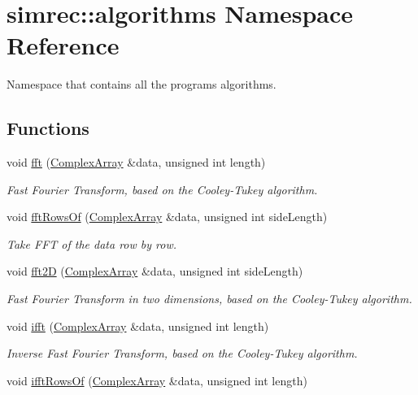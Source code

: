 \hypertarget{namespacesimrec_1_1algorithms}{\section{simrec\-:\-:algorithms \-Namespace \-Reference}
\label{namespacesimrec_1_1algorithms}
}


\-Namespace that contains all the programs algorithms.  


\subsection*{\-Functions}
\begin{DoxyCompactItemize}
\item 
void \hyperlink{namespacesimrec_1_1algorithms_a37aef7debc392fe813383df3acd4d85a}{fft} (\hyperlink{classsimrec_1_1ComplexArray}{\-Complex\-Array} \&data, unsigned int length)
\begin{DoxyCompactList}\small\item\em \-Fast \-Fourier \-Transform, based on the \-Cooley-\/\-Tukey algorithm. \end{DoxyCompactList}\item 
\hypertarget{namespacesimrec_1_1algorithms_a5928fdc735369e8c7c844801c765fd69}{void \hyperlink{namespacesimrec_1_1algorithms_a5928fdc735369e8c7c844801c765fd69}{fft\-Rows\-Of} (\hyperlink{classsimrec_1_1ComplexArray}{\-Complex\-Array} \&data, unsigned int side\-Length)}\label{namespacesimrec_1_1algorithms_a5928fdc735369e8c7c844801c765fd69}

\begin{DoxyCompactList}\small\item\em \-Take \-F\-F\-T of the data row by row. \end{DoxyCompactList}\item 
void \hyperlink{namespacesimrec_1_1algorithms_a0b1ecf3917cd8969b76546aa5bbd3220}{fft2\-D} (\hyperlink{classsimrec_1_1ComplexArray}{\-Complex\-Array} \&data, unsigned int side\-Length)
\begin{DoxyCompactList}\small\item\em \-Fast \-Fourier \-Transform in two dimensions, based on the \-Cooley-\/\-Tukey algorithm. \end{DoxyCompactList}\item 
void \hyperlink{namespacesimrec_1_1algorithms_ab4a5ca1d66a169d50f5a7c918885bc51}{ifft} (\hyperlink{classsimrec_1_1ComplexArray}{\-Complex\-Array} \&data, unsigned int length)
\begin{DoxyCompactList}\small\item\em \-Inverse \-Fast \-Fourier \-Transform, based on the \-Cooley-\/\-Tukey algorithm. \end{DoxyCompactList}\item 
\hypertarget{namespacesimrec_1_1algorithms_afd5845f2cb25b68b642dcb7fc91ce690}{void \hyperlink{namespacesimrec_1_1algorithms_afd5845f2cb25b68b642dcb7fc91ce690}{ifft\-Rows\-Of} (\hyperlink{classsimrec_1_1ComplexArray}{\-Complex\-Array} \&data, unsigned int length)}\label{namespacesimrec_1_1algorithms_afd5845f2cb25b68b642dcb7fc91ce690}


\end{DoxyCompactItemize}
